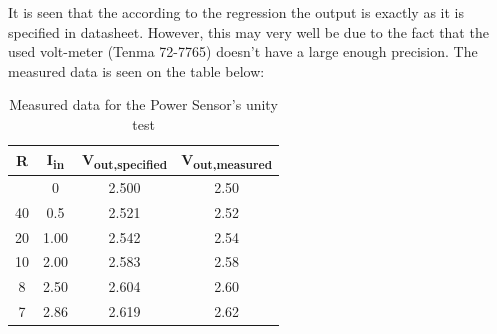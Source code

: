It is seen that the according to the regression the output is exactly as it is specified in datasheet. However, this may very well be due to the fact that the used volt-meter (Tenma 72-7765\cite{Tenma}) doesn't have a large enough precision. The measured data is seen on the table below:
\begin{table}[H]
	\centering
	\begin{tabular}{|c|c|c|c|}
		\hline
		\textbf{R}  & \textbf{I\textsubscript{in}}    & \textbf{V\textsubscript{out,specified}}     & \textbf{V\textsubscript{out,measured}}    \\ \hline
		& 0    & 2.500 & 2.50 \\ \hline
		40 & 0.5  & 2.521 & 2.52 \\ \hline
		20 & 1.00 & 2.542 & 2.54 \\ \hline
		10 & 2.00 & 2.583 & 2.58 \\ \hline
		8  & 2.50 & 2.604 & 2.60 \\ \hline
		7  & 2.86 & 2.619 & 2.62 \\ \hline
	\end{tabular}
	\caption{Measured data for the Power Sensor's unity test}
\end{table}